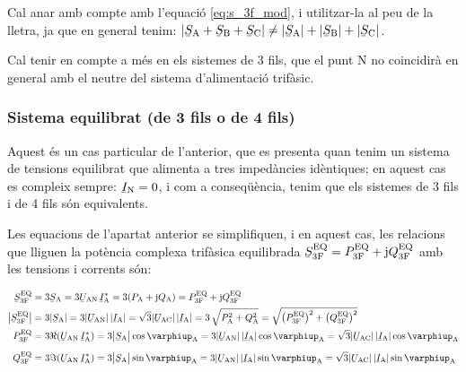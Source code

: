 Cal anar amb compte amb l'equaci\'{o} \eqref{eq:s_3f_mod}, i utilitzar-la al
peu de la lletra, ja
que en general tenim: $|\cmplx{S}\ped{A} + \cmplx{S}\ped{B} + \cmplx{S}\ped{C}| \neq
|\cmplx{S}\ped{A}| + |\cmplx{S}\ped{B}| + |\cmplx{S}\ped{C}|$.

Cal tenir en compte a m\'{e}s en els sistemes de 3 fils, que el punt
N no coincidir\`{a} en general amb el neutre del sistema
d'alimentaci\'{o} trif\`{a}sic.

\subsubsection{Sistema equilibrat (de 3 fils o de 4 fils)}

Aquest \'{e}s un cas particular de l'anterior, que es presenta quan
tenim un sistema de tensions equilibrat que alimenta a tres
imped\`{a}ncies id\`{e}ntiques; en aquest cas es compleix sempre:
$\cmplx{I}\ped{N}=0$, i com a conseq\"{u}\`{e}ncia, tenim que els sistemes de 3
fils i de 4 fils s\'{o}n equivalents.

Les equacions de l'apartat anterior se simplifiquen, i en aquest
cas, les relacions que lliguen la  pot\`{e}ncia complexa trif\`{a}sica
equilibrada $\cmplx{S}\ped{3F}\ap{EQ} = P\ped{3F}\ap{EQ} + \ju
Q\ped{3F}\ap{EQ}$ amb les tensions i corrents s\'{o}n:

\begin{align}
    \cmplx{S}\ped{3F}\ap{EQ} &= 3\cmplx{S}\ped{A} = 3\cmplx{U}\ped{AN}\, \cmplx{I}\ped{A}^* =
    3 (P\ped{A} + \ju Q\ped{A}) = P\ped{3F}\ap{EQ} +\ju Q\ped{3F}\ap{EQ} \label{eq:s_3f_eq}\\
    \big|\cmplx{S}\ped{3F}\ap{EQ}\big| &= 3|\cmplx{S}\ped{A} | =   3 |\cmplx{U}\ped{AN}| \,|\cmplx{I}\ped{A}| =
    \sqrt{3} |\cmplx{U}\ped{AC}|\, |\cmplx{I}\ped{A}| = 3\,\sqrt{P\ped{A}^2 + Q\ped{A}^2} =
    \sqrt{\big(P\ped{3F}\ap{EQ}\big)^2 + \big(Q\ped{3F}\ap{EQ}\big)^2} \\
    P\ped{3F}\ap{EQ} &= 3\Re(\cmplx{U}\ped{AN} \,\cmplx{I}\ped{A}^*) =
    3\big|\cmplx{S}\ped{A}\big| \cos \varphiup\ped{A} = 3 |\cmplx{U}\ped{AN}|\,
    |\cmplx{I}\ped{A}|\label{eq:p_3f_34}
    \cos \varphiup\ped{A} = \sqrt{3} |\cmplx{U}\ped{AC}|\,|\cmplx{I}\ped{A}| \cos \varphiup\ped{A} \\[2mm]
    Q\ped{3F}\ap{EQ} &= 3\Im(\cmplx{U}\ped{AN}\, \cmplx{I}\ped{A}^*) =
    3\big|\cmplx{S}\ped{A}\big|  \sin \varphiup\ped{A} = 3 |\cmplx{U}\ped{AN}| \, |\cmplx{I}\ped{A}|\label{eq:q_3f_34}
    \sin\varphiup\ped{A}=\sqrt{3} |\cmplx{U}\ped{AC}|\,|\cmplx{I}\ped{A}|\sin \varphiup\ped{A}
\end{align}

